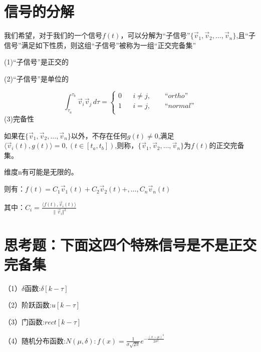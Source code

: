 \documentclass[UTF8]{ctexart}
\begin{document}
 \section{信号的分解}
 我们希望，对于我们的一个信号$f(t)$，可以分解为“子信号”$\{\vec{v}_1,\vec{v}_2,\ldots ,\vec{v}_n \} $,且“子信号”满足如下性质，则这组“子信号”被称为一组“正交完备集”\par
 (1)“子信号”是正交的 \par
 (2)“子信号”是单位的 \par
 \[  \int_{\tau _a}^{\tau _b} \vec{v }_i \vec{v }_j  \,d\tau  =\left\{ \begin{array}{rcl}
    0 & & {i\neq j,  \qquad  “ortho”}  \\
    1 & & {i= j,    \qquad    “normal”} \\
    \end{array} \right. \]
(3)完备性 \par
如果在$\{\vec{v}_1,\vec{v}_2,\ldots ,\vec{v}_n \} $以外，不存在任何$g(t)\neq 0$,满足$\langle \vec{v }_i (t), g (t)\rangle =0,(t\in [t_a,t_b ] )$,则称，$\{\vec{v}_1,\vec{v}_2,\ldots ,\vec{v}_n \} $为$f(t)$的正交完备集。\par
维度n有可能是无限的。 \par
则有：$f(t)=C_1 \vec{v}_1(t)+C_2 \vec{v}_2(t)+,\ldots ,C_n \vec{v}_n(t)$ \par
其中：$C_i=\frac{\langle f(t),\vec{v}_i(t) \rangle }{\|\vec{v}_i \Vert^2 }  $\par
\section{思考题：下面这四个特殊信号是不是正交完备集}
（1）$\delta $函数:$\delta [k-\tau ]$ \par
（2）阶跃函数:$u [k-\tau ]$ \par
（3）门函数:$rect [k-\tau ]$ \par
（4）随机分布函数:$N(\mu ,\delta ): f(x)=\frac{1}{\sigma \sqrt{2\pi }} e^{-\frac{(x-\mu )^2}{2\sigma ^2} } $ \par
\end{document}
